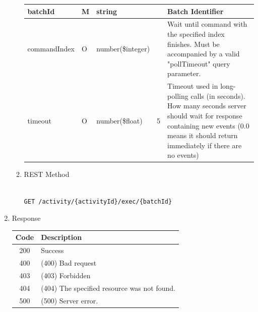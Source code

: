 \begin{enumerate}
\begin{enumerate}
\begin{table}[H]
\begin{center}
\begin{tabular}{|p{3cm}|l|p{3cm}|p{3cm}|p{4cm}|}
batchId					& M	& 	string				&			&	Batch Identifier \\ 
\hline

commandIndex			& O	& 	number(\$integer)	&			&	Wait until command with the specified index finishes. 
																	Must be accompanied by a valid "pollTimeout" query parameter. \\ 
\hline

timeout					& O	& 	number(\$float)		&	5		&	Timeout used in long-polling calls (in seconds). 
																	How many seconds server should wait for response containing new events 
																	(0.0 means it should return immediately if there are no events) \\ 
\hline


\end{tabular}
\end{center}
\end{table}


\item REST Method

\begin{tcolorbox}[boxrule=0pt, frame empty]
\begin{verbatim} 

GET /activity/{activityId}/exec/{batchId}

\end{verbatim}
\end{tcolorbox}

\end{enumerate}

\item Response

\begin{table}[H]
\footnotesize

\begin{center}
\begin{tabular}{|c|l|} 
\hline
\rowcolor{lightgray}	Code 		& 	Description \\
\hline
200	 		&	Success \\
\hline
400			&	(400) Bad request \\
\hline
403			&	(403) Forbidden	\\
\hline
404			&	(404) The specified resource was not found. \\
\hline
500			&	(500) Server error. \\
\hline
\end{tabular}
\end{center}
\end{table}


\end{enumerate}
